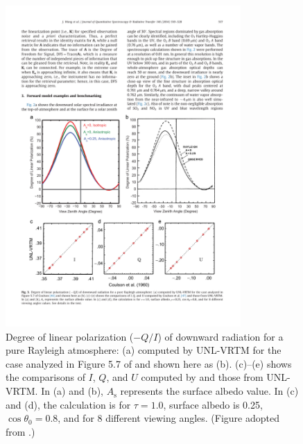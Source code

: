 \begin{figure}[t]
  \centering
  \includegraphics[width={0.8\textwidth}]{figures/unlvrtm2.pdf}
  \caption{Degree of linear polarization ($-Q/I$) of downward radiation
for a pure Rayleigh atmosphere: (a) computed by UNL-VRTM for the case
analyzed in Figure 5.7 of \citet{Coulson88} and shown here as (b). (c)--(e)
shows the comparisons of $I$, $Q$, and $U$ computed by \citet{Coulson60} and
those from UNL-VRTM. In (a) and (b), $A_\text{s}$ represents the surface albedo
value. In (c) and (d), the calculation is for $\tau=1.0$, surface albedo
is 0.25, $\cos{\theta_0}=0.8$, and for 8 different viewing angles.
(Figure adopted from \citet{Wang14}.)}
  \label{fig:unlvrtm2}
\end{figure}

